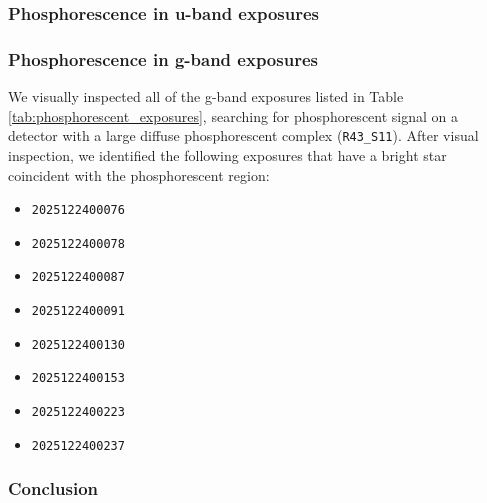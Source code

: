 \subsubsection{Phosphorescence in u-band exposures}

\subsubsection{Phosphorescence in g-band exposures}

We visually inspected all of the g-band exposures listed in Table \ref{tab:phosphorescent_exposures}, searching for phosphorescent signal on a detector with a large diffuse phosphorescent complex (\texttt{R43\_S11}). After visual inspection, we identified the following exposures that have a bright star coincident with the phosphorescent region:

\begin{itemize}
    \item \texttt{2025122400076}
    \item \texttt{2025122400078}
    \item \texttt{2025122400087}
    \item \texttt{2025122400091}
    \item \texttt{2025122400130}
    \item \texttt{2025122400153}
    \item \texttt{2025122400223}
    \item \texttt{2025122400237}
\end{itemize}

\subsubsection{Conclusion}